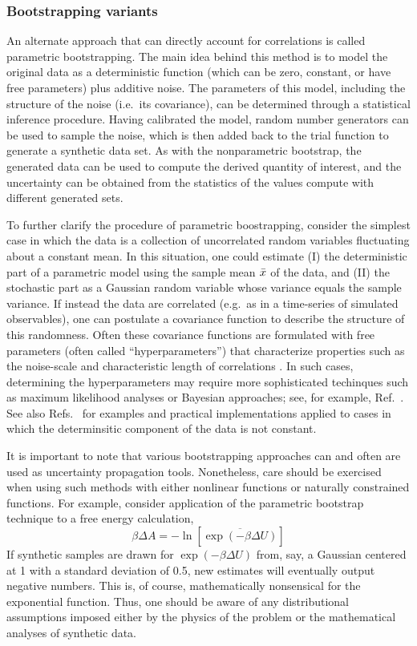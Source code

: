 \subsubsection{Bootstrapping variants}

An alternate approach that can directly account for correlations is called parametric bootstrapping.  The main idea behind this method is to model the original data as a deterministic function (which can be zero, constant, or have free parameters) plus additive noise.  The parameters of this model, including the structure of the noise (i.e.\ its covariance), can be determined through a statistical inference procedure.  Having calibrated the model, random number generators can be used to sample the noise, which is then added back to the trial function to generate a synthetic data set.   As with the nonparametric bootstrap, the generated data can be used to compute the derived quantity of interest, and the uncertainty can be obtained from the statistics of the values compute with different generated sets.

To further clarify the procedure of parametric boostrapping, consider the simplest case in which the data is a collection of uncorrelated random variables fluctuating about a constant mean.  In this situation, one could estimate (I) the deterministic part of a parametric model using the sample mean $\bar{x}$ of the data, and (II) the stochastic part as a Gaussian random variable whose variance equals the sample variance.  If instead the data are correlated (e.g.\ as in a time-series of simulated observables),  one can postulate a covariance function to describe the structure of this randomness.  Often these covariance functions are formulated with free parameters (often called ``hyperparameters'') that characterize properties such as the noise-scale and characteristic length of correlations \cite{Rasmussen}.  In such cases, determining the hyperparameters may require more sophisticated techinques such as maximum likelihood analyses or Bayesian approaches; see, for example, Ref.~\cite{Rasmussen}.  See also Refs.~\cite{patrone1,patrone2,patrone3} for examples and practical implementations applied to cases in which the determinsitic component of the data is not constant.

It is important to note that various bootstrapping approaches can and often are used as uncertainty propagation tools.  Nonetheless, care should be exercised when using such methods with either nonlinear functions or naturally constrained functions.  For example, consider application of the parametric bootstrap technique to a free energy calculation,
%
\begin{equation}
  \beta \Delta A = - \ln \left[ \overline{\exp\left(-\beta \Delta U\right)} \right]
\end{equation}
%
If synthetic samples are drawn for $\exp(-\beta \Delta U)$ from, say, a Gaussian centered at 1 with a standard deviation of 0.5, new estimates will eventually output negative numbers. This is, of course, mathematically nonsensical for the exponential function.  Thus, one should be aware of any distributional assumptions imposed either by the physics of the problem or the mathematical analyses of synthetic data.

